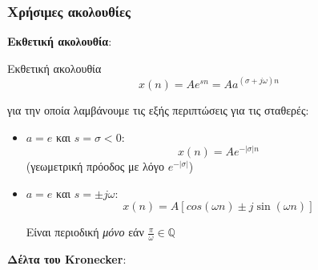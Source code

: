 \documentclass[11pt,a4paper,notitlepage,fleqn,draft]{article}
\begin{document}
\pagebreak[3]

\subsubsection{Χρήσιμες ακολουθίες}
\begin{enumpar}
	\item \textbf{Εκθετική ακολουθία}:

	\begin{minipage}{.5\textwidth}
		\begin{knowledgebox}{Εκθετική ακολουθία}
		\[ \displaystyle
		x(n) = Ae^{sn} = Aa^{(\sigma + j \omega )n}
		\]
		\end{knowledgebox}

		για την οποία λαμβάνουμε τις εξής περιπτώσεις για τις σταθερές:
		\begin{itemize}
			\item \( a=e \) και \( s = \sigma < 0 \):
			\[
			x(n) = Ae^{-|σ|n}
			\]
			(γεωμετρική πρόοδος με λόγο \( e^{-|σ|} \))
			\item \( a=e \) και \( s = \pm j\omega  \):
			\[
			x(n) = A\left[
			cos(\omega n) \pm j \sin(\omega n)
			\right]
			\]
			
			Είναι περιοδική \textit{μόνο} εάν \( \frac{\pi}{\omega } \in \mathbb Q \)
		\end{itemize}
	\end{minipage}
	\begin{minipage}{.5\textwidth}
		\begin{center}
		\end{center}
	\end{minipage}
    \item \textbf{Δέλτα του Kronecker}:


\end{enumpar}
\end{document}
